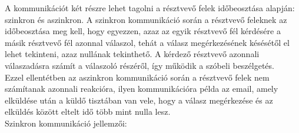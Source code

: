 
A kommunikációt két részre lehet tagolni a résztvevő felek időbeosztása alapján: szinkron és aszinkron. A szinkron kommunikáció során a résztvevő feleknek az időbeosztása meg kell, hogy egyezzen, azaz az egyik résztvevő fél kérdésére a másik résztvevő fél azonnal válaszol, tehát a válasz megérkezésének késésétől el lehet tekinteni, azaz nullának tekinthető. A kérdező résztvevő azonnali válaszadásra számít a válaszoló részéről, így működik a szóbeli beszélgetés.\\
Ezzel ellentétben az aszinkron kommunikáció során a résztvevő felek nem számítanak azonnali reakcióra, ilyen kommunikációra példa az email, amely elküldése után a küldő tisztában van vele, hogy a válasz megérkezése és az elküldés között eltelt idő több mint nulla lesz.\\
\newline
Szinkron kommunikáció jellemzői:

